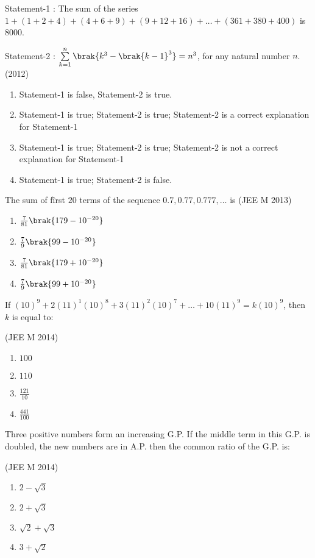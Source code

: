     \item 
    Statement-1 : The sum of the series $1+(1+2+4)+(4+6+9)+(9+12+16)+\dots+(361+380+400)$ is $8000$.    
    
    Statement-2 : $\sum\limits_{k=1}^n\brak{k^3-\brak{k-1}^3}=n^3$, for any natural number $n$.
    \hfill(2012)
    \begin{enumerate}
    \item Statement-1 is false, Statement-2 is true.
    \item Statement-1 is true; Statement-2 is true; Statement-2 is a correct explanation for Statement-1
    \item Statement-1 is true; Statement-2 is true; Statement-2 is not a correct explanation for Statement-1
    \item Statement-1 is true; Statement-2 is false.
    \end{enumerate}
        
    \item The sum of fîrst $20$ terms of the sequence $0.7,0.77,0.777,\dots$ is 
    \hfill(JEE M 2013)
    
    \begin{enumerate}
    \item$\frac{7}{81}\brak{179-10^{-20}}$
    \item$\frac{7}{9}\brak{99-10^{-20}}$
    \item$\frac{7}{81}\brak{179+10^{-20}}$
    \item$\frac{7}{9}\brak{99+10^{-20}}$
    \end{enumerate}

    \item If $(10)^9+2(11)^1(10)^8+3(11)^2(10)^7+\dots+10(11)^9=k(10)^9$, then $k$ is equal to:
    
    \hfill(JEE M 2014)
    \begin{enumerate}
    \item$100$
    \item$110$
    \item$\frac{121}{10}$
    \item$\frac{441}{100}$ 
    \end{enumerate}

    \item Three positive numbers form an increasing G.P. If the middle term in this G.P. is doubled, the new numbers are in A.P. then the common ratio of the G.P. is: 
    
    \hfill(JEE M 2014)
    \begin{enumerate}
    \item$2-\sqrt{3}$
    \item$2+\sqrt{3}$
    \item$\sqrt{2}+\sqrt{3}$
    \item$3+\sqrt{2}$ 
    \end{enumerate}

